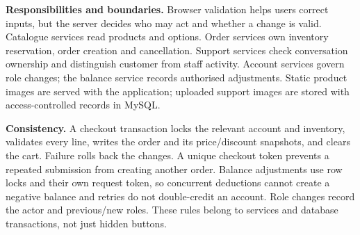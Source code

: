 \textbf{Responsibilities and boundaries.} Browser validation helps users correct inputs, but the server decides who may act and whether a change is valid. Catalogue services read products and options. Order services own inventory reservation, order creation and cancellation. Support services check conversation ownership and distinguish customer from staff activity. Account services govern role changes; the balance service records authorised adjustments. Static product images are served with the application; uploaded support images are stored with access-controlled records in MySQL.

\textbf{Consistency.} A checkout transaction locks the relevant account and inventory, validates every line, writes the order and its price/discount snapshots, and clears the cart. Failure rolls back the changes. A unique checkout token prevents a repeated submission from creating another order. Balance adjustments use row locks and their own request token, so concurrent deductions cannot create a negative balance and retries do not double-credit an account. Role changes record the actor and previous/new roles. These rules belong to services and database transactions, not just hidden buttons.

